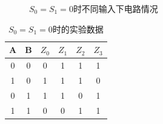 \documentclass[UTF8]{ctexart}
\numberwithin{figure}{subsection}
\numberwithin{table}{subsection}
\numberwithin{equation}{subsection}
\begin{document}
\begin{figure}[H]
    \centering

    \caption{\(S_0  = S_1 = 0\)时不同输入下电路情况}
    \label{00 pic}
\end{figure}

\begin{table}[h]
    \begin{center}
        \begin{tabular}{|c|c|c|c|c|c|}
            \hline
            A & B & \(Z_0\) & \(Z_1\) & \(Z_2\) & \(Z_3\) \\
            \hline
            0 & 0 & 0 & 1 & 1 & 1 \\
            \hline
            1 & 0 & 1 & 1 & 1 & 0 \\
            \hline
            0 & 1 & 1 & 1 & 0 & 1 \\
            \hline
            1 & 1 & 0 & 0 & 1 & 1 \\
            \hline
        \end{tabular}
        \caption{\(S_0  = S_1 = 0\)时的实验数据}
    \end{center}
    \label{00 data}
\end{table}
\end{document}
